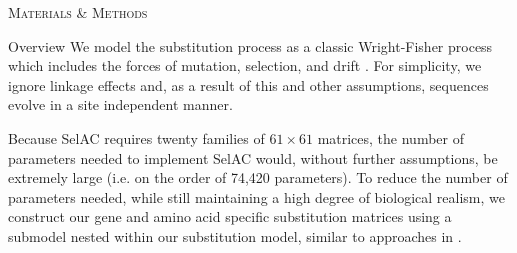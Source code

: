 \documentclass[12pt,letterpaper]{article}
\renewcommand{\section}[1]{%
\bigskip
\begin{center}
\begin{Large}
\normalfont\scshape #1
\medskip
\end{Large}
\end{center}}
\renewcommand{\subsection}[1]{%
\bigskip
\begin{center}
\begin{large}
\normalfont\itshape #1
\end{large}
\end{center}}
\newcommand{\selac}{SelAC\xspace}
\begin{document}
\section{Materials \& Methods}
\subsection*{Overview}
We model the substitution process as a classic Wright-Fisher process which includes the forces of mutation, selection, and drift \citep{Fisher1930,Kimura1962,Wright1969,Iwasa1988,BergAndLassig2003,SellaAndHirsh2005,McCandlishAndStoltzfus2014}.
For simplicity, we ignore linkage effects and, as a result of this and other assumptions, sequences evolve in  a site independent manner.

Because \selac requires twenty families of $61 \times 61$ matrices, the number of parameters needed to implement \selac would, without further assumptions, be extremely large (i.e. on the order of 74,420 parameters).
To reduce the number of parameters needed, while still maintaining a high degree of biological realism, we construct our gene and amino acid specific substitution matrices using a submodel nested within our substitution model, similar to approaches in \citet{Gilchrist2007,ShahAndGilchrist2011,GilchristEtAl2015}.
\end{document}
